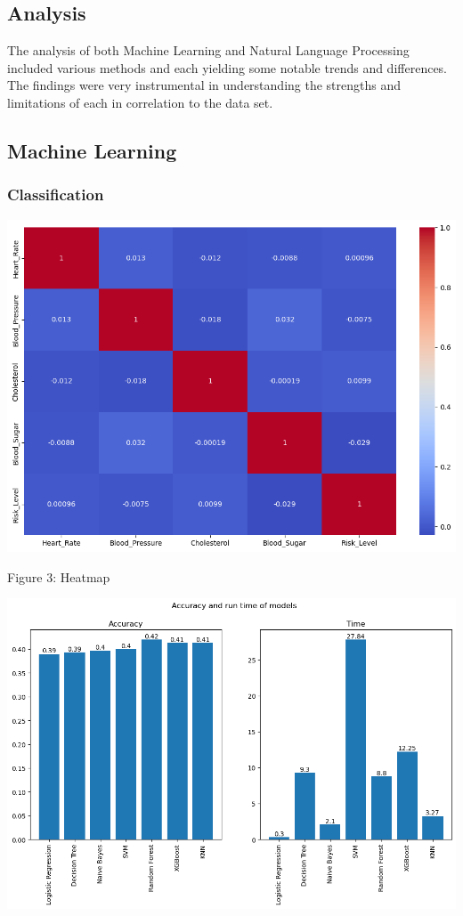 \documentclass{article}
\begin{document}
\begin{multicols}{2}
\section{Analysis}

The analysis of both Machine Learning and Natural Language Processing included various methods and each yielding some notable trends and differences. The findings were very instrumental in understanding the strengths and limitations of each in correlation to the data set. 

\subsection{Machine Learning}

\subsubsection{Classification}

\includegraphics[scale=.3]{img/heatmap.png}

{\small
  Figure 3: Heatmap
  \par
  \vspace{6pt}
}

\includegraphics[scale=.27]{img/classcompare.png}


\end{multicols}
\end{document}
